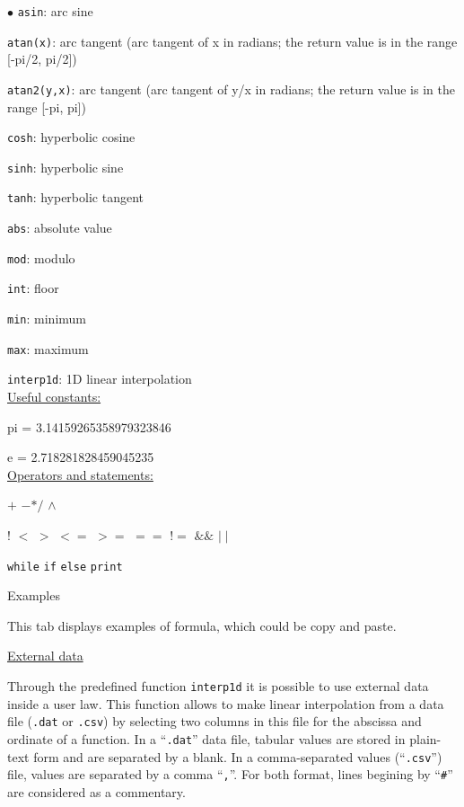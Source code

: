 {{{\begin{list}{$\bullet$}{}
\texttt{asin}: arc sine

\texttt{atan(x)}: arc tangent (arc tangent of x in radians; the return value is in the range [-pi/2, pi/2])

\texttt{atan2(y,x)}: arc tangent (arc tangent of y/x in radians; the return value is in the range [-pi, pi])

\texttt{cosh}: hyperbolic cosine

\texttt{sinh}: hyperbolic sine

\texttt{tanh}: hyperbolic tangent

\texttt{abs}: absolute value

\texttt{mod}: modulo

\texttt{int}: floor

\texttt{min}: minimum

\texttt{max}: maximum

\texttt{interp1d}: 1D linear interpolation\\


\underline{Useful constants:}

pi = 3.14159265358979323846

e = 2.718281828459045235\\


\underline{Operators and statements:}

$+$ \qquad$-$\qquad $*$\qquad $/$ \qquad$\wedge$

! \qquad $<$ \qquad $>$ \qquad $<=$ \qquad $>=$ \qquad $==$ \qquad $!=$ \qquad $\&\&$ \qquad $\mid\mid$

\texttt{while} \texttt{if} \texttt{else} \texttt{print}


\item Examples

This tab displays examples of formula, which could be copy and paste.

\end{list}

\underline{External data}

Through the predefined function \texttt{interp1d} it is possible to use
external data inside a user law. This function allows to make linear interpolation
from a data file (\texttt{.dat} or \texttt{.csv}) by selecting two columns in this file
for the abscissa and ordinate of a function. In a ``\texttt{.dat}'' data file, tabular
values are stored in plain-text form and are separated by a blank. In a comma-separated values
(``\texttt{.csv}'') file, values are separated by a comma ``\texttt{,}''.
For both format, lines begining by ``\texttt{\#}'' are considered as a commentary.

}}}
